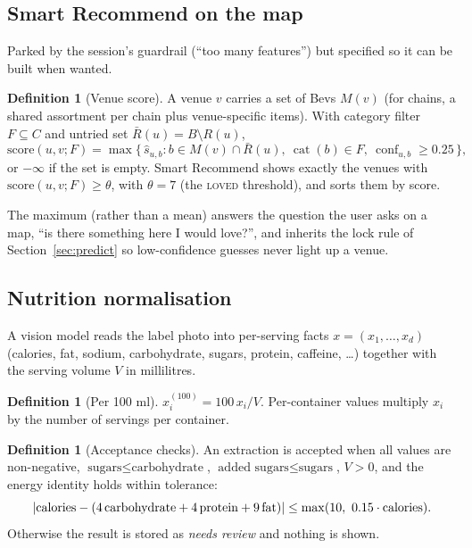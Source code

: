 \documentclass[11pt]{article}
\DeclarePairedDelimiter\abs{\lvert}{\rvert}
\DeclareMathOperator{\conf}{conf}
\DeclareMathOperator{\cat}{cat}
\newcommand{\shat}{\hat{s}}
\theoremstyle{plain}
\theoremstyle{definition}
\newtheorem{definition}[theorem]{Definition}
\theoremstyle{remark}
\begin{document}
\subsection{Smart Recommend on the map}\label{sec:smart}

Parked by the session's guardrail (``too many features'') but specified so it can be built when wanted.

\begin{definition}[Venue score]
A venue $v$ carries a set of Bevs $M(v)$ (for chains, a shared assortment per chain plus venue-specific items). With category filter $F \subseteq C$ and untried set $\bar R(u) = B \setminus R(u)$,
\begin{equation}\label{eq:venue}
\mathrm{score}(u, v; F) = \max\bigl\{\, \shat_{u,b} : b \in M(v) \cap \bar R(u),\ \cat(b) \in F,\ \conf_{u,b} \ge 0.25 \,\bigr\},
\end{equation}
or $-\infty$ if the set is empty. Smart Recommend shows exactly the venues with $\mathrm{score}(u, v; F) \ge \theta$, with $\theta = 7$ (the \textsc{loved} threshold), and sorts them by score.
\end{definition}

The maximum (rather than a mean) answers the question the user asks on a map, ``is there something here I would love?'', and inherits the lock rule of Section~\ref{sec:predict} so low-confidence guesses never light up a venue.

\subsection{Nutrition normalisation}\label{sec:nutrition}

A vision model reads the label photo into per-serving facts $x = (x_1, \dots, x_d)$ (calories, fat, sodium, carbohydrate, sugars, protein, caffeine, \dots) together with the serving volume $V$ in millilitres.

\begin{definition}[Per 100 ml]
$x^{(100)}_i = 100\, x_i / V$. Per-container values multiply $x_i$ by the number of servings per container.
\end{definition}

\begin{definition}[Acceptance checks]
An extraction is accepted when all values are non-negative, $\text{sugars} \le \text{carbohydrate}$, $\text{added sugars} \le \text{sugars}$, $V > 0$, and the energy identity holds within tolerance:
\[
\abs{\text{calories} - (4\,\text{carbohydrate} + 4\,\text{protein} + 9\,\text{fat})} \le \max(10,\ 0.15\cdot \text{calories}).
\]
Otherwise the result is stored as \emph{needs review} and nothing is shown.
\end{definition}
\end{document}
